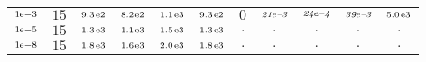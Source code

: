 \begin{tiny}
\begin{tabular}{@{$\;$}c@{$\;$}|@{$\;$}c@{$\;$}@{$\;$}c@{$\;$}@{$\;$}c@{$\;$}@{$\;$}c@{$\;$}@{$\;$}c@{$\;$}|@{$\;$}c@{$\;$}@{$\;$}c@{$\;$}@{$\;$}c@{$\;$}@{$\;$}c@{$\;$}@{$\;$}c@{$\;$}}
$\scriptstyle1\!\mathrm{\hspace{0.10em}e}-3$ & $\scriptstyle15$ & $\scriptstyle9.3\mathrm{\hspace{0.10em}e}2$ & $\scriptstyle8.2\mathrm{\hspace{0.10em}e}2$ & $\scriptstyle1.1\mathrm{\hspace{0.10em}e}3$ & $\scriptstyle9.3\mathrm{\hspace{0.10em}e}2$ & $\scriptstyle0$ & $\scriptstyle\textit{21}\hspace{0.00em}e\textit{--3}$ & $\scriptstyle\textit{24}\hspace{0.00em}e\textit{--4}$ & $\scriptstyle\textit{39}\hspace{0.00em}e\textit{--3}$ & $\scriptstyle5.0\mathrm{\hspace{0.10em}e}3$\\ 
$\scriptstyle1\!\mathrm{\hspace{0.10em}e}-5$ & $\scriptstyle15$ & $\scriptstyle1.3\mathrm{\hspace{0.10em}e}3$ & $\scriptstyle1.1\mathrm{\hspace{0.10em}e}3$ & $\scriptstyle1.5\mathrm{\hspace{0.10em}e}3$ & $\scriptstyle1.3\mathrm{\hspace{0.10em}e}3$ & $\scriptstyle.$ & $\scriptstyle.$ & $\scriptstyle.$ & $\scriptstyle.$ & $\scriptstyle.$\\ 
$\scriptstyle1\!\mathrm{\hspace{0.10em}e}-8$ & $\scriptstyle15$ & $\scriptstyle1.8\mathrm{\hspace{0.10em}e}3$ & $\scriptstyle1.6\mathrm{\hspace{0.10em}e}3$ & $\scriptstyle2.0\mathrm{\hspace{0.10em}e}3$ & $\scriptstyle1.8\mathrm{\hspace{0.10em}e}3$ & $\scriptstyle.$ & $\scriptstyle.$ & $\scriptstyle.$ & $\scriptstyle.$ & $\scriptstyle.$\\ 
\end{tabular} 
\end{tiny} 
